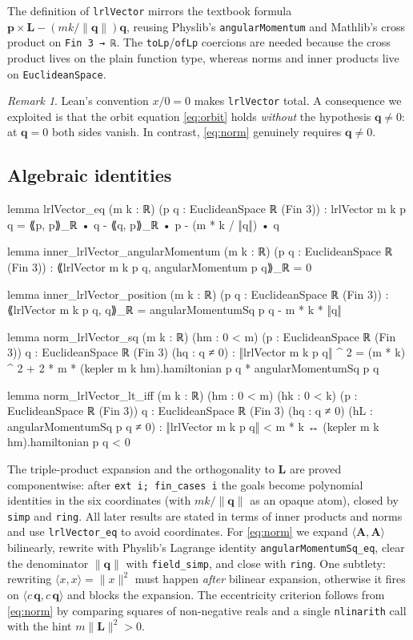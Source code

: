 \documentclass[11pt]{article}
\theoremstyle{definition}
\theoremstyle{remark}
\newtheorem{remark}[theorem]{Remark}
\newcommand{\vA}{\mathbf{A}}
\newcommand{\vL}{\mathbf{L}}
\newcommand{\vp}{\mathbf{p}}
\newcommand{\vq}{\mathbf{q}}
\newcommand{\ip}[2]{\langle #1, #2\rangle}
\begin{document}
The definition of \texttt{lrlVector} mirrors the textbook formula $\vp\times\vL-(mk/\|\vq\|)\vq$,
reusing Physlib's \texttt{angularMomentum} and Mathlib's cross product on \texttt{Fin 3 → ℝ}. The
\texttt{toLp}/\texttt{ofLp} coercions are needed because the cross product lives on the plain
function type, whereas norms and inner products live on \texttt{EuclideanSpace}.

\begin{remark}
Lean's convention $x/0=0$ makes \texttt{lrlVector} total. A consequence we exploited is that the
orbit equation \eqref{eq:orbit} holds \emph{without} the hypothesis $\vq\neq0$: at $\vq=0$ both
sides vanish. In contrast, \eqref{eq:norm} genuinely requires $\vq\ne0$.
\end{remark}

\subsection{Algebraic identities}\label{sec:algebra}

\begin{lean}
lemma lrlVector_eq (m k : ℝ) (p q : EuclideanSpace ℝ (Fin 3)) :
    lrlVector m k p q = ⟪p, p⟫_ℝ • q - ⟪q, p⟫_ℝ • p - (m * k / ‖q‖) • q

lemma inner_lrlVector_angularMomentum (m k : ℝ) (p q : EuclideanSpace ℝ (Fin 3)) :
    ⟪lrlVector m k p q, angularMomentum p q⟫_ℝ = 0

lemma inner_lrlVector_position (m k : ℝ) (p q : EuclideanSpace ℝ (Fin 3)) :
    ⟪lrlVector m k p q, q⟫_ℝ = angularMomentumSq p q - m * k * ‖q‖

lemma norm_lrlVector_sq (m k : ℝ) (hm : 0 < m) (p : EuclideanSpace ℝ (Fin 3))
    {q : EuclideanSpace ℝ (Fin 3)} (hq : q ≠ 0) :
    ‖lrlVector m k p q‖ ^ 2 =
      (m * k) ^ 2 + 2 * m * (kepler m k hm).hamiltonian p q * angularMomentumSq p q

lemma norm_lrlVector_lt_iff (m k : ℝ) (hm : 0 < m) (hk : 0 < k)
    (p : EuclideanSpace ℝ (Fin 3)) {q : EuclideanSpace ℝ (Fin 3)} (hq : q ≠ 0)
    (hL : angularMomentumSq p q ≠ 0) :
    ‖lrlVector m k p q‖ < m * k ↔ (kepler m k hm).hamiltonian p q < 0
\end{lean}

The triple-product expansion and the orthogonality to $\vL$ are proved componentwise: after
\texttt{ext i; fin\_cases i} the goals become polynomial identities in the six coordinates (with
$mk/\|\vq\|$ as an opaque atom), closed by \texttt{simp} and \texttt{ring}. All later results are
stated in terms of inner products and norms and use \texttt{lrlVector\_eq} to avoid coordinates.
For \eqref{eq:norm} we expand $\ip{\vA}{\vA}$ bilinearly, rewrite with Physlib's Lagrange
identity \texttt{angularMomentumSq\_eq}, clear the denominator $\|\vq\|$ with
\texttt{field\_simp}, and close with \texttt{ring}. One subtlety: rewriting
$\ip{x}{x}=\|x\|^2$ must happen \emph{after} bilinear expansion, otherwise it fires on
$\ip{c\,\vq}{c\,\vq}$ and blocks the expansion. The eccentricity criterion follows from
\eqref{eq:norm} by comparing squares of non-negative reals and a single \texttt{nlinarith} call
with the hint $m\|\vL\|^2>0$.
\end{document}
